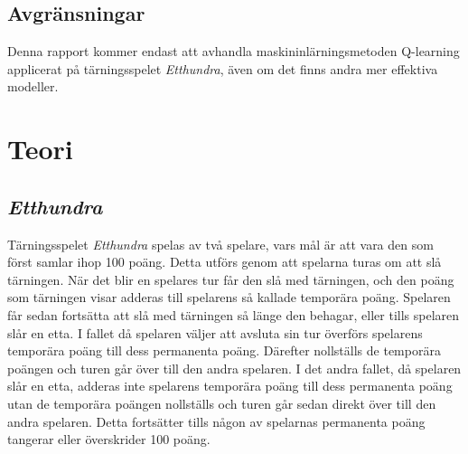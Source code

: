 \documentclass[12pt,a4paper]{article}
\begin{document}
    \subsection{Avgränsningar}\label{subsec:avgransningar} 
      Denna rapport kommer endast att avhandla maskininlärningsmetoden Q-learning applicerat på tärningsspelet \emph{Etthundra}, även om det finns andra mer effektiva modeller.
    
  \cleardoublepage

  \section{Teori}\label{sec:teori}
    \subsection{\emph{Etthundra}}\label{subsec:etthundra} 
      Tärningsspelet \emph{Etthundra} spelas av två spelare, vars mål är att vara den som först samlar ihop 100 poäng. Detta utförs genom att spelarna turas om att slå tärningen. När det blir en spelares tur får den slå med tärningen, och den poäng som tärningen visar adderas till  spelarens så kallade temporära poäng. Spelaren får sedan fortsätta att slå med tärningen så länge den behagar, eller tills spelaren slår en etta. I fallet då spelaren väljer att avsluta sin tur överförs spelarens temporära poäng till dess permanenta poäng. Därefter nollställs de temporära poängen och turen går över till den andra spelaren. I det andra fallet, då spelaren slår en etta, adderas inte spelarens temporära poäng till dess permanenta poäng utan de temporära poängen nollställs och turen går sedan direkt över till den andra spelaren. Detta fortsätter tills någon av spelarnas permanenta poäng tangerar eller överskrider 100 poäng.
\end{document}
